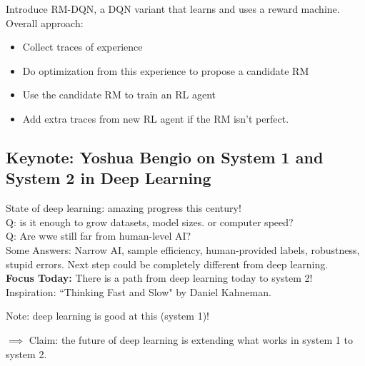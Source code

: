 Introduce RM-DQN, a DQN variant that learns and uses a reward machine. \\

Overall approach:
\begin{itemize}
    \item Collect traces of experience
    \item Do optimization from this experience to propose a candidate RM
    \item Use the candidate RM to train an RL agent
    \item Add extra traces from new RL agent if the RM isn't perfect.
\end{itemize}

\spacerule


\subsection{Keynote: Yoshua Bengio on System 1 and System 2 in Deep Learning}

State of deep learning: amazing progress this century! \\

Q: is it enough to grow datasets, model sizes. or computer speed? \\

Q: Are wwe still far from human-level AI? \\

Some Answers: Narrow AI, sample efficiency, human-provided labels, robustness, stupid errors. Next step could be completely different from deep learning. \\

{\bf Focus Today:} There is a path from deep learning today to system 2! \\


Inspiration: ``Thinking Fast and Slow" by Daniel Kahneman.


Note: deep learning is good at this (system 1)!  


$\implies$ Claim: the future of deep learning is extending what works in system 1 to system 2. \\

